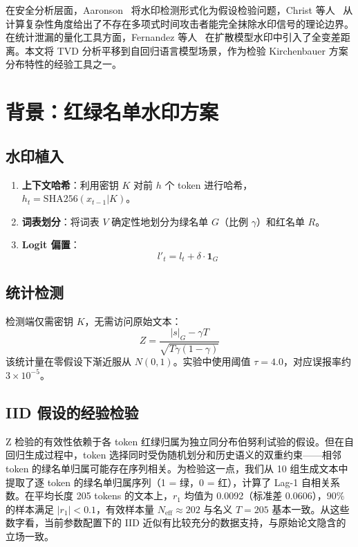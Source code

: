 \documentclass[11pt,a4paper]{article}
\begin{document}
在安全分析层面，Aaronson~\cite{aaronson2023watermark} 将水印检测形式化为假设检验问题，Christ 等人~\cite{christ2023undetectable} 从计算复杂性角度给出了不存在多项式时间攻击者能完全抹除水印信号的理论边界。在统计泄漏的量化工具方面，Fernandez 等人~\cite{fernandez2023stable} 在扩散模型水印中引入了全变差距离。本文将 TVD 分析平移到自回归语言模型场景，作为检验 Kirchenbauer 方案分布特性的经验工具之一。

\section{背景：红绿名单水印方案}

\subsection{水印植入}
\begin{enumerate}
    \item \textbf{上下文哈希}：利用密钥 $K$ 对前 $h$ 个 token 进行哈希，$h_t = \text{SHA256}(x_{t-1} | K)$。
    \item \textbf{词表划分}：将词表 $V$ 确定性地划分为绿名单 $G$（比例 $\gamma$）和红名单 $R$。
    \item \textbf{Logit 偏置}：
    \begin{equation}
        l'_t = l_t + \delta \cdot \mathbf{1}_{G}
    \end{equation}
\end{enumerate}

\subsection{统计检测}
检测端仅需密钥 $K$，无需访问原始文本：
\begin{equation}
    Z = \frac{|s|_G - \gamma T}{\sqrt{T \gamma (1-\gamma)}}
\end{equation}
该统计量在零假设下渐近服从 $N(0, 1)$。实验中使用阈值 $\tau = 4.0$，对应误报率约 $3 \times 10^{-5}$。

\subsection{IID 假设的经验检验}
Z 检验的有效性依赖于各 token 红绿归属为独立同分布伯努利试验的假设。但在自回归生成过程中，token 选择同时受伪随机划分和历史语义的双重约束——相邻 token 的绿名单归属可能存在序列相关。为检验这一点，我们从 10 组生成文本中提取了逐 token 的绿名单归属序列（1 = 绿，0 = 红），计算了 Lag-1 自相关系数。在平均长度 205 tokens 的文本上，$r_1$ 均值为 0.0092（标准差 0.0606），$90\%$ 的样本满足 $|r_1| < 0.1$，有效样本量 $N_{\text{eff}} \approx 202$ 与名义 $T=205$ 基本一致。从这些数字看，当前参数配置下的 IID 近似有比较充分的数据支持，与原始论文隐含的立场一致。
\end{document}
